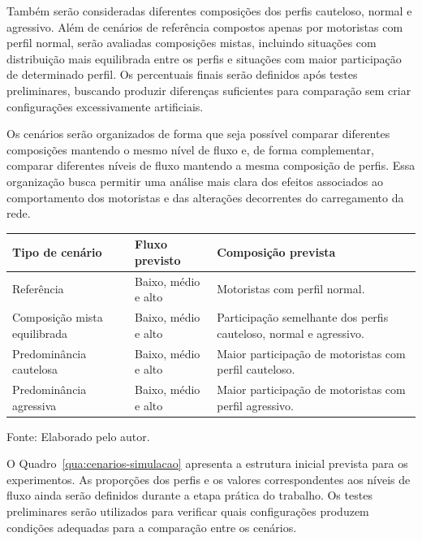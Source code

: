 Também serão consideradas diferentes composições dos perfis cauteloso, normal e agressivo. Além de cenários de referência compostos apenas por motoristas com perfil normal, serão avaliadas composições mistas, incluindo situações com distribuição mais equilibrada entre os perfis e situações com maior participação de determinado perfil. Os percentuais finais serão definidos após testes preliminares, buscando produzir diferenças suficientes para comparação sem criar configurações excessivamente artificiais.

Os cenários serão organizados de forma que seja possível comparar diferentes composições mantendo o mesmo nível de fluxo e, de forma complementar, comparar diferentes níveis de fluxo mantendo a mesma composição de perfis. Essa organização busca permitir uma análise mais clara dos efeitos associados ao comportamento dos motoristas e das alterações decorrentes do carregamento da rede.

\begin{quadro}[H]
\centering
\caption{Estrutura inicial dos cenários de simulação}
\label{qua:cenarios-simulacao}
\small
\renewcommand{\arraystretch}{1.25}

\begin{tabular}{|p{4.7cm}| p{3cm}| p{7.2cm}|}
\hline
\textbf{Tipo de cenário} & \textbf{Fluxo previsto} & \textbf{Composição prevista} \\
\hline
Referência & Baixo, médio e alto & Motoristas com perfil normal. \\
\hline
Composição mista equilibrada & Baixo, médio e alto & Participação semelhante dos perfis cauteloso, normal e agressivo. \\
\hline
Predominância cautelosa & Baixo, médio e alto & Maior participação de motoristas com perfil cauteloso. \\
\hline
Predominância agressiva & Baixo, médio e alto & Maior participação de motoristas com perfil agressivo. \\
\hline
\end{tabular}

\par\vspace{0.25cm}
\begin{minipage}{\textwidth}
\footnotesize Fonte: Elaborado pelo autor.
\end{minipage}

\end{quadro}

O Quadro~\ref{qua:cenarios-simulacao} apresenta a estrutura inicial prevista para os experimentos. As proporções dos perfis e os valores correspondentes aos níveis de fluxo ainda serão definidos durante a etapa prática do trabalho. Os testes preliminares serão utilizados para verificar quais configurações produzem condições adequadas para a comparação entre os cenários.

